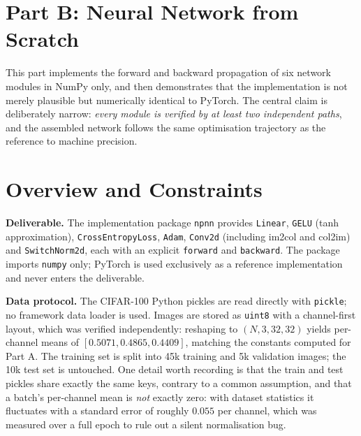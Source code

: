 
\clearpage
\section*{Part B: Neural Network from Scratch}
\setcounter{section}{0}
\renewcommand{\thesection}{B.\arabic{section}}

This part implements the forward and backward propagation of six network modules in NumPy only,
and then demonstrates that the implementation is not merely plausible but numerically identical to
PyTorch. The central claim is deliberately narrow: \emph{every module is verified by at least two
independent paths}, and the assembled network follows the same optimisation trajectory as the
reference to machine precision.

\section{Overview and Constraints}
\label{sec:partb-overview}

\textbf{Deliverable.} The implementation package \texttt{npnn} provides \texttt{Linear},
\texttt{GELU} (tanh approximation), \texttt{CrossEntropyLoss}, \texttt{Adam}, \texttt{Conv2d}
(including im2col and col2im) and \texttt{SwitchNorm2d}, each with an explicit \texttt{forward}
and \texttt{backward}. The package imports \texttt{numpy} only; PyTorch is used exclusively as a
reference implementation and never enters the deliverable.

\textbf{Data protocol.} The CIFAR-100 Python pickles are read directly with \texttt{pickle};
no framework data loader is used. Images are stored as \texttt{uint8} with a channel-first layout,
which was verified independently: reshaping to $(N,3,32,32)$ yields per-channel means of
$[0.5071, 0.4865, 0.4409]$, matching the constants computed for Part A. The training set is split
into 45k training and 5k validation images; the 10k test set is untouched. One detail worth
recording is that the train and test pickles share exactly the same keys, contrary to a common
assumption, and that a batch's per-channel mean is \emph{not} exactly zero: with dataset statistics
it fluctuates with a standard error of roughly $0.055$ per channel, which was measured over a full
epoch to rule out a silent normalisation bug.

